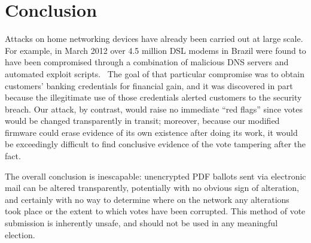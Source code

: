 \documentclass{article}
\begin{document}
\section{Conclusion}

Attacks on home networking devices have already been carried out at
large scale. For example, in March 2012 over 4.5 million DSL modems in
Brazil were found to have been compromised through a combination of
malicious DNS servers and automated exploit
scripts.~\cite{BrazilExploit} The goal of that particular compromise
was to obtain customers' banking credentials for financial gain, and
it was discovered in part because the illegitimate use of those
credentials alerted customers to the security breach. Our attack, by
contrast, would raise no immediate ``red flags'' since votes would be
changed transparently in transit; moreover, because our modified
firmware could erase evidence of its own existence after doing its
work, it would be exceedingly difficult to find conclusive evidence of
the vote tampering after the fact.

The overall conclusion is inescapable: unencrypted PDF ballots sent
via electronic mail can be altered transparently, potentially with no
obvious sign of alteration, and certainly with no way to determine
where on the network any alterations took place or the extent to which
votes have been corrupted. This method of vote submission is
inherently unsafe, and should not be used in any meaningful election.










% 
\end{document}
